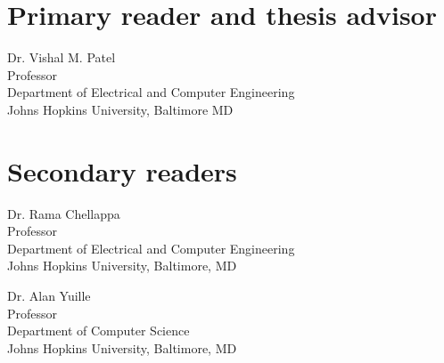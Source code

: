 \begin{singlespace}

    \section*{Primary reader and thesis advisor}
    
    Dr. Vishal M. Patel \\
    Professor\\
    Department of Electrical and Computer Engineering\\
    Johns Hopkins University, Baltimore MD 


    \section*{Secondary readers}
    
    Dr. Rama Chellappa\\
    Professor\\
    Department of Electrical and Computer Engineering\\
    Johns Hopkins University, Baltimore, MD 
    
    \vspace{0.1in}
    
    Dr. Alan Yuille\\
    Professor\\
    Department of Computer Science\\
    Johns Hopkins University, Baltimore, MD 



\end{singlespace}